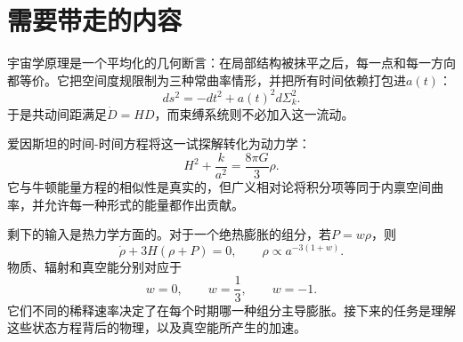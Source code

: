 \begin{classroomqa}
\end{classroomqa}

\section{需要带走的内容}

宇宙学原理是一个平均化的几何断言：在局部结构被抹平之后，每一点和每一方向都等价。它把空间度规限制为三种常曲率情形，并把所有时间依赖打包进\(a(t)\)：
\begin{equation}
ds^2=-dt^2+a(t)^2d\Sigma_k^2.
\end{equation}
于是共动间距满足\(\dot D=HD\)，而束缚系统则不必加入这一流动。

爱因斯坦的时间-时间方程将这一试探解转化为动力学：
\begin{equation}
H^2+\frac{k}{a^2}=\frac{8\pi G}{3}\rho.
\end{equation}
它与牛顿能量方程的相似性是真实的，但广义相对论将积分项等同于内禀空间曲率，并允许每一种形式的能量都作出贡献。

剩下的输入是热力学方面的。对于一个绝热膨胀的组分，若\(P=w\rho\)，则
\begin{equation}
\dot\rho+3H(\rho+P)=0,
\qquad
\rho\propto a^{-3(1+w)}.
\end{equation}
物质、辐射和真空能分别对应于
\begin{equation}
w=0,\qquad w=\frac13,\qquad w=-1.
\end{equation}
它们不同的稀释速率决定了在每个时期哪一种组分主导膨胀。接下来的任务是理解这些状态方程背后的物理，以及真空能所产生的加速。
